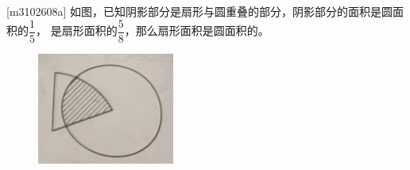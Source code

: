 \begin{minipage}[c]{0.6\textwidth}
    [m3102608a]\quad
    如图，已知阴影部分是扇形与圆重叠的部分，阴影部分的面积是圆面积的$\dfrac{1}{5}$，
    是扇形面积的$\dfrac{5}{8}$，那么扇形面积是圆面积的。
\end{minipage}
\begin{minipage}[c]{0.4\textwidth}
    \begin{figure}[H]
        \centering
        \includegraphics[width=0.4\textwidth,keepaspectratio]{m3102608ab}
    \end{figure}
\end{minipage}   
\par